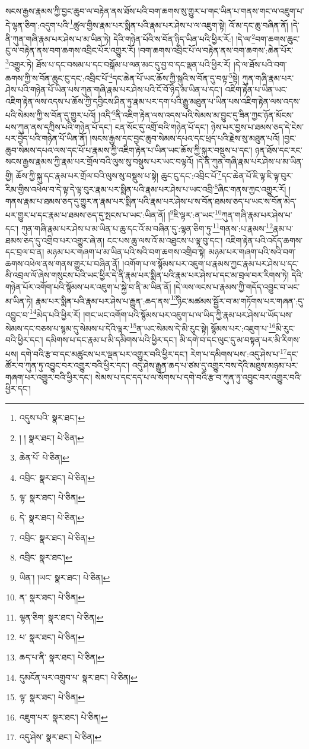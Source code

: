 སངས་རྒྱས་རྣམས་ཀྱི་བྱང་ཆུབ་ལ་བརྟེན་ནས་ཐོས་པའི་བག་ཆགས་སུ་གྱུར་པ་གང་ཡིན་པ་གནས་གང་ལ་འཇུག་པ་དེ་ལྷན་ཅིག་:འདུག་པའི་\footnote{འདུས་པའི་  སྣར་ཐང་། }ཚུལ་གྱིས་རྣམ་པར་སྨིན་པའི་རྣམ་པར་ཤེས་པ་ལ་འཇུག་སྟེ། འོ་མ་དང་ཆུ་བཞིན་ནོ། །དེ་ནི་ཀུན་གཞི་རྣམ་པར་ཤེས་པ་མ་ཡིན་ཏེ། དེའི་གཉེན་པོའི་ས་བོན་ཉིད་ཡིན་པའི་ཕྱིར་རོ:། །དེ་ལ་\footnote{། །  སྣར་ཐང་།  པེ་ཅིན། }བག་ཆགས་ཆུང་ངུ་ལ་བརྟེན་ནས་བག་ཆགས་འབྲིང་པོར་འགྱུར་རོ། །བག་ཆགས་འབྲིང་པོ་ལ་བརྟེན་ནས་བག་ཆགས་:ཆེན་པོར་\footnote{ཆེན་པོ་  པེ་ཅིན། }འགྱུར་ཏེ། ཐོས་པ་དང་བསམ་པ་དང་བསྒོམ་པ་ལན་མང་དུ་བྱ་བ་དང་ལྡན་པའི་ཕྱིར་རོ། །དེ་ལ་ཐོས་པའི་བག་ཆགས་ཀྱི་ས་བོན་ཆུང་ངུ་དང་:འབྲིང་པོ་\footnote{འབྲིང་  སྣར་ཐང་།  པེ་ཅིན། }དང་ཆེན་པོ་ཡང་ཆོས་ཀྱི་སྐུའི་ས་བོན་དུ་བལྟ་\footnote{ལྟ་  སྣར་ཐང་།  པེ་ཅིན། }སྟེ། ཀུན་གཞི་རྣམ་པར་ཤེས་པའི་གཉེན་པོ་ཡིན་པས་ཀུན་གཞི་རྣམ་པར་ཤེས་པའི་ངོ་བོ་ཉིད་མ་ཡིན་པ་དང་། འཇིག་རྟེན་པ་ཡིན་ཡང་འཇིག་རྟེན་ལས་འདས་པ་ཆོས་ཀྱི་དབྱིངས་ཤིན་ཏུ་རྣམ་པར་དག་པའི་རྒྱུ་མཐུན་པ་ཡིན་པས་འཇིག་རྟེན་ལས་འདས་པའི་སེམས་ཀྱི་ས་བོན་དུ་གྱུར་པའོ། །འདི་\footnote{དེ་  སྣར་ཐང་།  པེ་ཅིན། }ནི་འཇིག་རྟེན་ལས་འདས་པའི་སེམས་མ་བྱུང་དུ་ཟིན་ཀྱང་ཉོན་མོངས་པས་ཀུན་ནས་དཀྲིས་པའི་གཉེན་པོ་དང་། ངན་སོང་དུ་འགྲོ་བའི་གཉེན་པོ་དང་། ཉེས་པར་བྱས་པ་ཐམས་ཅད་དེ་ངེས་པར་བྱེད་པའི་གཉེན་པོ་ཡིན་ནོ། །སངས་རྒྱས་དང་བྱང་ཆུབ་སེམས་དཔའ་དང་ཕྲད་པའི་རྗེས་སུ་མཐུན་པའོ། །བྱང་ཆུབ་སེམས་དཔའ་ལས་དང་པོ་པ་རྣམས་ཀྱི་འཇིག་རྟེན་པ་ཡིན་ཡང་ཆོས་ཀྱི་སྐུར་བསྡུས་པ་དང་། ཉན་ཐོས་དང་རང་སངས་རྒྱས་རྣམས་ཀྱི་རྣམ་པར་གྲོལ་བའི་ལུས་སུ་བསྡུས་པར་ཡང་བལྟའོ། །དེ་ནི་ཀུན་གཞི་རྣམ་པར་ཤེས་པ་མ་ཡིན་གྱི། ཆོས་ཀྱི་སྐུ་དང་རྣམ་པར་གྲོལ་བའི་ལུས་སུ་བསྡུས་པ་སྟེ། ཆུང་ངུ་དང་:འབྲིང་པོ་\footnote{འབྲིང་  སྣར་ཐང་།  པེ་ཅིན། }དང་ཆེན་པོ་ཇི་ལྟ་ཇི་ལྟ་བུར་རིམ་གྱིས་འཕེལ་བ་དེ་ལྟ་དེ་ལྟ་བུར་རྣམ་པར་སྨིན་པའི་རྣམ་པར་ཤེས་པ་ཡང་འབྲི་\footnote{འབྲིང་  སྣར་ཐང་། }ཞིང་གནས་ཀྱང་འགྱུར་རོ། །གནས་རྣམ་པ་ཐམས་ཅད་དུ་གྱུར་ན་རྣམ་པར་སྨིན་པའི་རྣམ་པར་ཤེས་པ་ས་བོན་ཐམས་ཅད་པ་ཡང་ས་བོན་མེད་པར་གྱུར་པ་དང་རྣམ་པ་ཐམས་ཅད་དུ་སྤངས་པ་ཡང་:ཡིན་ནོ། །\footnote{ཡིན་། །ཡང་  སྣར་ཐང་།  པེ་ཅིན། }ཇི་ལྟར་:ན་ཡང་\footnote{ན་  སྣར་ཐང་།  པེ་ཅིན། }ཀུན་གཞི་རྣམ་པར་ཤེས་པ་དང་། ཀུན་གཞི་རྣམ་པར་ཤེས་པ་མ་ཡིན་པ་ཆུ་དང་འོ་མ་བཞིན་དུ་:ལྷན་ཅིག་ཏུ་\footnote{ལྷན་ཅིག་  སྣར་ཐང་།  པེ་ཅིན། }གནས་:པ་རྣམས་\footnote{པ་  སྣར་ཐང་།  པེ་ཅིན། }རྣམ་པ་ཐམས་ཅད་དུ་འགྲིབ་པར་འགྱུར་ཞེ་ན། ངང་པས་ཆུ་ལས་འོ་མ་འཐུངས་པ་ལྟ་བུ་དང་། འཇིག་རྟེན་པའི་འདོད་ཆགས་དང་བྲལ་བ་ན། མཉམ་པར་གཞག་པ་མ་ཡིན་པའི་སའི་བག་ཆགས་འགྲིབ་སྟེ། མཉམ་པར་གཞག་པའི་སའི་བག་ཆགས་འཕེལ་ནས་གནས་གྱུར་པ་བཞིན་ནོ། །འགོག་པ་ལ་སྙོམས་པར་འཇུག་པ་རྣམས་ཀྱང་རྣམ་པར་ཤེས་པ་དང་མི་འབྲལ་ལོ་ཞེས་གསུངས་པའི་ཡང་ཕྱིར་དེ་ནི་རྣམ་པར་སྨིན་པའི་རྣམ་པར་ཤེས་པ་དང་མ་བྲལ་བར་རིགས་ཏེ། དེའི་གཉེན་པོར་འགོག་པའི་སྙོམས་པར་འཇུག་པ་སྐྱེ་བ་ནི་མ་ཡིན་ནོ། །དེ་ལས་ལངས་པ་རྣམས་ཀྱི་གདོད་འབྱུང་བ་ཡང་མ་ཡིན་ཏེ། རྣམ་པར་སྨིན་པའི་རྣམ་པར་ཤེས་པ་རྒྱུན་:ཆད་ནས་\footnote{ཆད་པ་ནི་  སྣར་ཐང་།  པེ་ཅིན། }ཉིང་མཚམས་སྦྱོར་བ་མ་གཏོགས་པར་གཞན་:དུ་འབྱུང་བ་\footnote{དུམངོན་པར་འགྲུབ་པ་  སྣར་ཐང་།  པེ་ཅིན། }མེད་པའི་ཕྱིར་རོ། །གང་ཡང་འགོག་པའི་སྙོམས་པར་འཇུག་པ་ལ་ཡིད་ཀྱི་རྣམ་པར་ཤེས་པ་ཡོད་པས་སེམས་དང་བཅས་པ་སྙམ་དུ་སེམས་པ་དེའི་ལྟར་\footnote{ལྟ་  སྣར་ཐང་།  པེ་ཅིན། }ན་ཡང་སེམས་དེ་མི་རུང་སྟེ། སྙོམས་པར་:འཇུག་པ་\footnote{འཇུག་པར་  སྣར་ཐང་།  པེ་ཅིན། }མི་རུང་བའི་ཕྱིར་དང་། དམིགས་པ་དང་རྣམ་པ་མི་དམིགས་པའི་ཕྱིར་དང་། མི་དགེ་བ་དང་ལུང་དུ་མ་བསྟན་པར་མི་རིགས་པས། དགེ་བའི་རྩ་བ་དང་མཚུངས་པར་ལྡན་པར་འགྱུར་བའི་ཕྱིར་དང་། རེག་པ་དམིགས་པས་:འདུ་ཤེས་པ་\footnote{འདུ་ཤེས་  སྣར་ཐང་།  པེ་ཅིན། }དང་ཚོར་བ་ཀུན་ཏུ་འབྱུང་བར་འགྱུར་བའི་ཕྱིར་དང་། འདུ་ཤེས་རྒྱུན་ཆད་པ་ཙམ་དུ་འགྱུར་བས་དེའི་མཐུས་མཉམ་པར་གཞག་པར་འགྱུར་བའི་ཕྱིར་དང་། སེམས་པ་དང་དད་པ་ལ་སོགས་པ་དགེ་བའི་རྩ་བ་ཀུན་ཏུ་འབྱུང་བར་འགྱུར་བའི་ཕྱིར་དང་། 